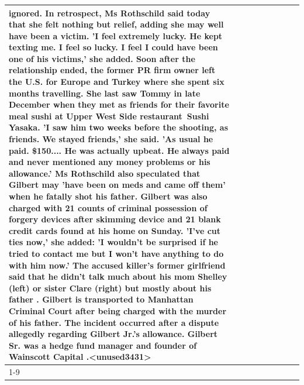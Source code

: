 \begin{table}[H]
\begin{tabular}{lllrlllll}
ignored. In retrospect, Ms Rothschild said today that she felt nothing but relief, adding she may well have been a victim. 'I feel extremely lucky. He kept texting me. I feel so lucky. I feel I could have been one of his victims,' she added. Soon after the relationship ended, the former PR firm owner left the U.S. for Europe and Turkey where she spent six months  travelling. She last saw Tommy in late December when they met as friends for their favorite meal sushi at Upper West Side restaurant Sushi Yasaka. 'I saw him two weeks before the shooting, as friends. We stayed friends,' she said. 'As usual he paid. \$150.... He was actually upbeat. He always paid and never mentioned any money problems or his allowance.' Ms Rothschild also speculated that Gilbert may 'have been on meds and came off them' when he fatally shot his father. Gilbert was also charged with 21 counts of criminal possession of forgery devices after skimming device and 21 blank credit cards found at his home on Sunday. 'I've cut ties now,' she added: 'I wouldn’t be surprised if he tried to contact me but I won’t have anything to do with him now.' The accused killer's former girlfriend said that he didn't talk much about his mom Shelley (left) or sister Clare (right) but mostly about his father . Gilbert is transported to Manhattan Criminal Court  after being charged with the murder of his father. The incident occurred after a dispute allegedly regarding Gilbert Jr.'s allowance. Gilbert Sr. was a hedge fund manager and founder of Wainscott Capital .<unused3431> \\
\cline{1-9}

\end{tabular}
\end{table}
